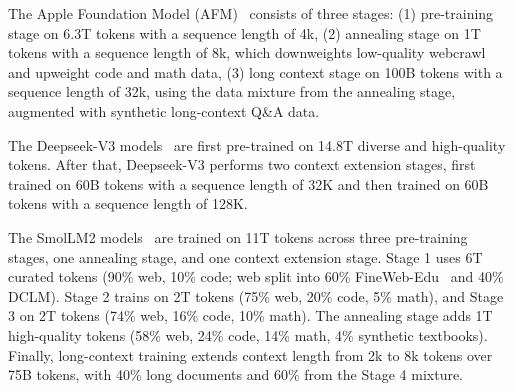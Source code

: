The Apple Foundation Model (AFM)~\cite{gunter2024apple} consists of three stages: (1) pre-training stage on 6.3T tokens with a sequence length of 4k, (2) annealing stage on 1T tokens with a sequence length of 8k, which downweights low-quality webcrawl and upweight code and math data, (3) long context stage on 100B tokens with a sequence length of 32k, using the data mixture from the annealing stage, augmented with synthetic long-context Q\&A data.

The Deepseek-V3 models~\cite{DeepSeekAI2024DeepSeekV3TR} are first pre-trained on 14.8T diverse and high-quality tokens. After that, Deepseek-V3 performs two context extension stages, first trained on 60B tokens with a sequence length of 32K and then trained on 60B tokens with a sequence length of 128K.

The SmolLM2 models~\cite{allal2025smollm2} are trained on 11T tokens across three pre-training stages, one annealing stage, and one context extension stage. Stage 1 uses 6T curated tokens (90\% web, 10\% code; web split into 60\% FineWeb-Edu~\cite{penedo2024fineweb} and 40\% DCLM). Stage 2 trains on 2T tokens (75\% web, 20\% code, 5\% math), and Stage 3 on 2T tokens (74\% web, 16\% code, 10\% math). The annealing stage adds 1T high-quality tokens (58\% web, 24\% code, 14\% math, 4\% synthetic textbooks). Finally, long-context training extends context length from 2k to 8k tokens over 75B tokens, with 40\% long documents and 60\% from the Stage 4 mixture.

